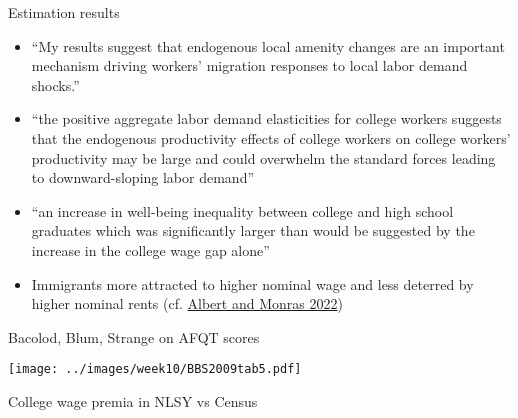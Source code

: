\documentclass[11pt,notes=hide,aspectratio=169]{beamer}
\begin{document}
\begin{frame}{Estimation results}
\begin{itemize}
	\item ``My results suggest that endogenous local amenity changes are an important mechanism driving workers' migration responses to local labor demand shocks.''
	\item ``the positive aggregate labor demand elasticities for college workers suggests that the endogenous productivity effects of college workers on college workers' productivity may be large and could overwhelm the standard forces leading to downward-sloping labor demand''
	\item ``an increase in well-being inequality between college and high school graduates which was significantly larger than would be suggested by the increase in the college wage gap alone''
	\item Immigrants more attracted to higher nominal wage and less deterred by higher nominal rents (cf. \href{https://www.aeaweb.org/articles?id=10.1257/aer.20211241}{Albert and Monras 2022})
\end{itemize}
\end{frame}
\begin{frame}{Bacolod, Blum, Strange on AFQT scores}
\hypertarget{BBS2009tab5}{}
\begin{center}\texttt{[image: ../images/week10/BBS2009tab5.pdf]}\end{center}
\vspace{-5mm}
\hyperlink{NLSY_main}{\beamerreturnbutton}
\end{frame}
\begin{frame}{College wage premia in NLSY vs Census}
\hypertarget{BSPvsCensus}{}

\hyperlink{NLSY_main}{\beamerreturnbutton}
\end{frame}
\end{document}
